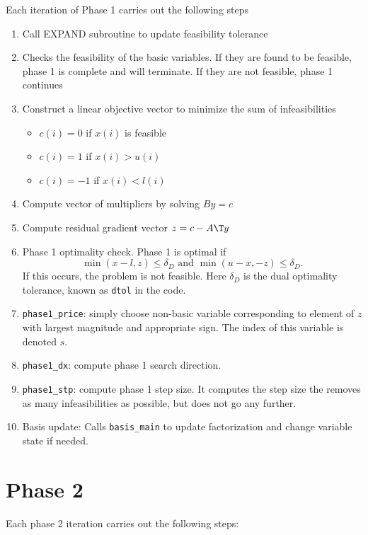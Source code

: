 \documentclass[11pt]{article}
\newcommand{\code}[1]{\texttt{#1}}
\begin{document}
Each iteration of Phase 1 carries out the following steps
\begin{enumerate}
\item Call EXPAND subroutine to update feasibility tolerance
\item Checks the feasibility of the basic variables.  If they are found to be
  feasible, phase 1 is complete and will terminate.  If they are not feasible,
  phase 1 continues
\item Construct a linear objective vector to minimize the sum of
  infeasibilities
  \begin{itemize}
    \item $c(i) = 0$ if $x(i)$ is feasible
    \item $c(i) = 1$ if $x(i) > u(i)$
    \item $c(i) = -1$ if $x(i) < l(i)$
  \end{itemize}
\item Compute vector of multipliers by solving $By=c$
\item Compute residual gradient vector $z = c - A\T y$
\item Phase 1 optimality check.  Phase 1 is optimal if
\begin{equation*}
\min(x-l,z) \le \delta_D \text{ and } \min(u-x,-z) \le \delta_D.
\end{equation*}
If this occurs, the problem is not feasible.  Here $\delta_D$ is the dual
optimality tolerance, known as \code{dtol} in the code.
\item \code{phase1\_price}: simply choose non-basic variable corresponding to element
  of $z$ with largest magnitude and appropriate sign.  The index of this
  variable is denoted $s$.
\item \code{phase1\_dx}: compute phase 1 search direction.
\item \code{phase1\_stp}: compute phase 1 step size.  It computes the step size
  the removes as many infeasibilities as possible, but does not go any further.
\item Basis update:  Calls \code{basis\_main} to update factorization and
  change variable state if needed.
\end{enumerate}

\section{Phase 2}

Each phase 2 iteration carries out the following steps:
\end{document}
